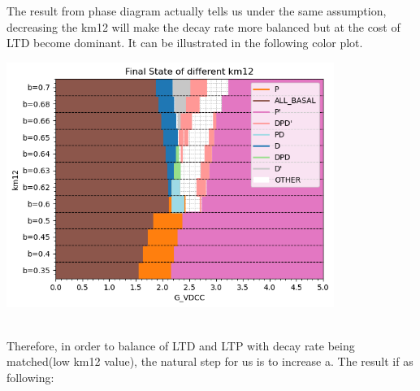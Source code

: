 \documentclass{article}
\begin{document}
The result from phase diagram actually tells us under the same assumption, decreasing the km12 will make the decay rate more balanced but at the cost of LTD become dominant. It can be illustrated in the following color plot.\\
\begin{minipage}{\textwidth} %
    \centering
    \includegraphics[width=0.8\textwidth]{fix a=0.04.png} %
    \label{fig:a0.25}
\end{minipage}\\
Therefore, in order to balance of LTD and LTP with decay rate being matched(low km12 value), the natural step for us is to increase a. The result if as following:
\end{document}
